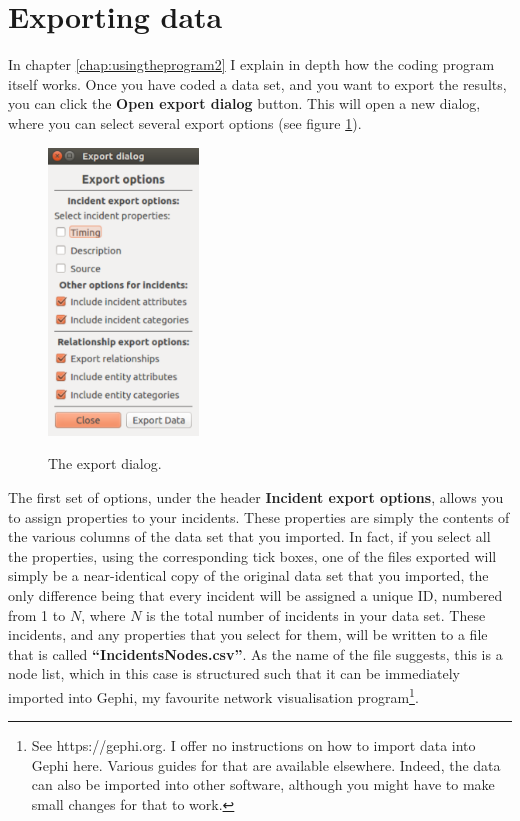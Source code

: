 \documentclass{memoir}
\begin{document}
\section{Exporting data}
\label{sec:exportingdata}

In chapter \ref{chap:usingtheprogram2} I explain in depth how the coding program itself works. Once you have coded a data set, and you want to export the results, you can click the \textbf{Open export dialog} button. This will open a new dialog, where you can select several export options (see figure \ref{fig:exportdialog}).

\begin{figure}[h!]
  \centering
  \caption{The export dialog.}
  \includegraphics[width=40mm]{Screenshot_6.pdf}
  \label{fig:exportdialog}
\end{figure}

The first set of options, under the header \textbf{Incident export options}, allows you to assign properties to your incidents. These properties are simply the contents of the various columns of the data set that you imported. In fact, if you select all the properties, using the corresponding tick boxes, one of the files exported will simply be a near-identical copy of the original data set that you imported, the only difference being that every incident will be assigned a unique ID, numbered from 1 to \(N\), where \(N\) is the total number of incidents in your data set. These incidents, and any properties that you select for them, will be written to a file that is called \textbf{``Incidents\textunderscore Nodes.csv''}. As the name of the file suggests, this is a node list, which in this case is structured such that it can be immediately imported into Gephi, my favourite network visualisation program\footnote{See https://gephi.org. I offer no instructions on how to import data into Gephi here. Various guides for that are available elsewhere. Indeed, the data can also be imported into other software, although you might have to make small changes for that to work.}. 
\end{document}
